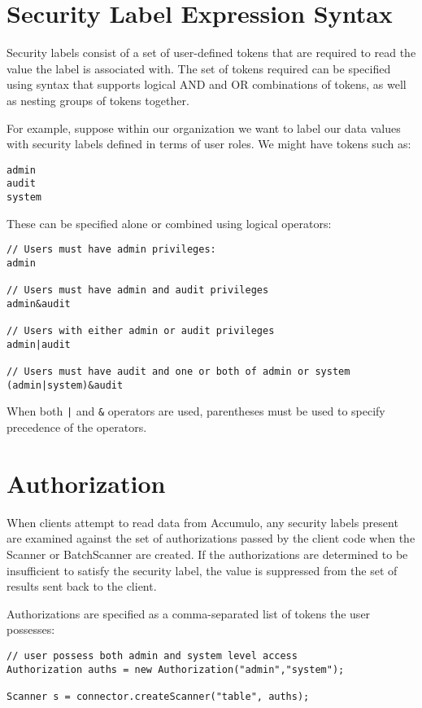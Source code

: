 \section{Security Label Expression Syntax}

Security labels consist of a set of user-defined tokens that are required to read the
value the label is associated with. The set of tokens required can be specified using
syntax that supports logical AND and OR combinations of tokens, as well as nesting
groups of tokens together.

For example, suppose within our organization we want to label our data values with
security labels defined in terms of user roles. We might have tokens such as:

\begingroup\fontsize{8pt}{8pt}\selectfont\begin{verbatim}
admin
audit
system
\end{verbatim}\endgroup

These can be specified alone or combined using logical operators:

\begingroup\fontsize{8pt}{8pt}\selectfont\begin{verbatim}
// Users must have admin privileges:
admin

// Users must have admin and audit privileges
admin&audit

// Users with either admin or audit privileges
admin|audit

// Users must have audit and one or both of admin or system
(admin|system)&audit
\end{verbatim}\endgroup

When both \verb^|^ and \verb^&^ operators are used, parentheses must be used to specify
precedence of the operators.

\section{Authorization}

When clients attempt to read data from Accumulo, any security labels present are
examined against the set of authorizations passed by the client code when the
Scanner or BatchScanner are created. If the authorizations are determined to be
insufficient to satisfy the security label, the value is suppressed from the set of
results sent back to the client.

Authorizations are specified as a comma-separated list of tokens the user possesses:

\begingroup\fontsize{8pt}{8pt}\selectfont\begin{verbatim}
// user possess both admin and system level access
Authorization auths = new Authorization("admin","system");

Scanner s = connector.createScanner("table", auths);
\end{verbatim}\endgroup

